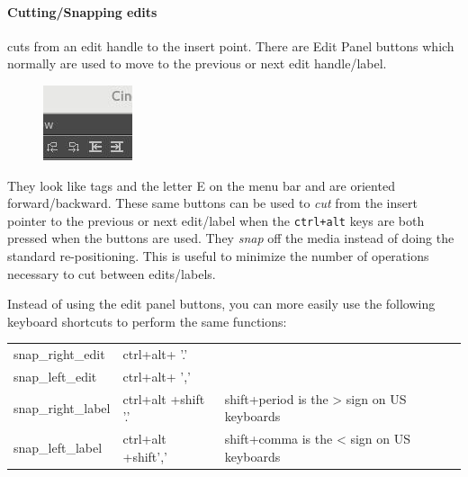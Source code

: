 \paragraph{Cutting/Snapping edits} cuts from an edit handle to the insert point. 
There are Edit Panel buttons which normally are used to move to the previous or next edit handle/label.
\begin{figure}
    \vspace{-1ex}
    \centering
    \includegraphics[width=0.7\linewidth]{images/snap.png}
\end{figure}
They look like tags and the letter E on the menu bar and are oriented forward/backward.  These same buttons can be used to \textit{cut} from the insert pointer to the previous or next edit/label when the \texttt{ctrl+alt} keys are both pressed when the buttons are used.  They \textit{snap} off the media instead of doing the standard re-positioning.  This is useful to minimize the number of operations necessary to cut between edits/labels.

Instead of using the edit panel buttons, you can more easily use the following keyboard shortcuts to perform the same functions:
\begin{center}
    \begin{tabular}{l l l}
        \toprule
        snap\_right\_edit &	ctrl+alt+ '.' & \\
        snap\_left\_edit &	ctrl+alt+ ',' & \\
        snap\_right\_label &	ctrl+alt +shift '.' &  shift+period is the > sign on US keyboards \\
        snap\_left\_label & 	ctrl+alt +shift',' &  shift+comma is the < sign on US keyboards \\
        \bottomrule
    \end{tabular}
\end{center}

